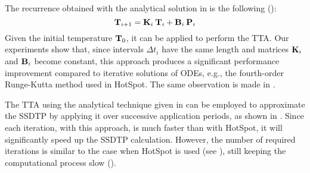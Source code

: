 \label{ap:tta-analytical}
The recurrence obtained with the analytical solution in  is the following ():
\[
  \mathbf{T}_{i+1} = \mathbf{K}_i \: \mathbf{T}_i + \mathbf{B}_i \: \mathbf{P}_i
\]
Given the initial temperature $\mathbf{T}_0$, it can be applied to perform the TTA. Our experiments show that, since intervals $\Delta t_i$ have the same length and matrices $\mathbf{K}_i$ and $\mathbf{B}_i$ become constant, this approach produces a significant performance improvement compared to iterative solutions of ODEs, e.g., the fourth-order Runge-Kutta method used in HotSpot. The same observation is made in \cite{thiele2011}.

The TTA using the analytical technique given in  can be employed to approximate the SSDTP by applying it over successive application periods, as shown in . Since each iteration, with this approach, is much faster than with HotSpot, it will significantly speed up the SSDTP calculation. However, the number of required iterations is similar to the case when HotSpot is used (see ), still keeping the computational process slow ().
